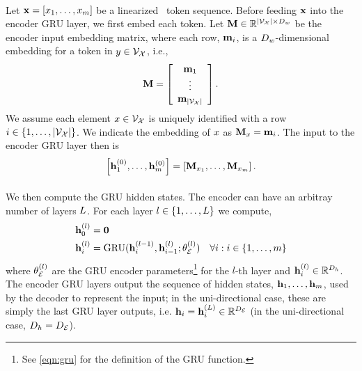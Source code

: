 \paragraph{}
Let $\mathbf{x} = \left[ x_1,\ldots,x_{m}\right]$ be a linearized 
\meaningrepresentation~token sequence. Before feeding $\mathbf{x}$ into the encoder
GRU layer, we first embed each token. Let $\mathbf{M} \in \mathbb{R}^{{\left\vert \mathcal{V}_{\mathcal{X}} \right\vert} \times D_{w}}$ be the encoder input embedding matrix, where each row, $\mathbf{m}_i$, is a $D_{w}$-dimensional embedding for a token in $y \in \mathcal{V}_{\mathcal{X}}$, i.e.,
\[ \mathbf{M} = \left[ \begin{array}{c} \mathbf{m}_1\\ \vdots \\ \mathbf{m}_{\left\vert \mathcal{V}_{\mathcal{X}} \right\vert} \end{array}\right]. \]
    We assume each element $x \in \mathcal{V}_{\mathcal{X}}$ is uniquely identified with a row   $i \in \left\{1, \ldots, {\left\vert \mathcal{V}_{\mathcal{X}} \right\vert}\right\}$. We indicate
    the embedding of $x$ as $\mathbf{M}_{x} = \mathbf{m}_i$.
    The input to the encoder GRU layer then is 
\[\left[\mathbf{h}^{(0)}_1,\ldots,\mathbf{h}^{(0)}_{m}\right] = \left[\mathbf{M}_{x_1},\ldots,
                                                                            \mathbf{M}_{x_{m}}\right]. \]


\paragraph{}
We then compute the GRU hidden states. The encoder can have an arbitray number of layers $L$.
For each layer $l \in \{1,\ldots, L\}$ we compute,
\begin{align*}
    \mathbf{h}_0^{(l)} & = \mathbf{0} \\
    \mathbf{h}_i^{(l)} & =\operatorname{GRU}(\mathbf{h}_i^{(l - 1)}, \mathbf{h}_{i-1}^{(l)}; \theta_\mathcal{E}^{(l)}) & \forall i : i \in \{1,\ldots, m\}
\end{align*}
where $\theta_\mathcal{E}^{(l)}$ are the GRU encoder parameters\footnote{See \autoref{eqn:gru} for the definition of the GRU function.} for the $l$-th layer and $\mathbf{h}^{(l)}_i \in \mathbb{R}^{D_{h}}$. The encoder GRU layers output the 
sequence of hidden states, $\mathbf{h}_1,\ldots,\mathbf{h}_{m}$, used by the decoder to represent the input; 
in the uni-directional case, these are simply the last GRU layer outputs, i.e. $\mathbf{h}_i = \mathbf{h}_i^{(L)} \in \mathbb{R}^{{D_\mathcal{E}}}$ (in the uni-directional case, $D_{h} = {D_\mathcal{E}}$).

